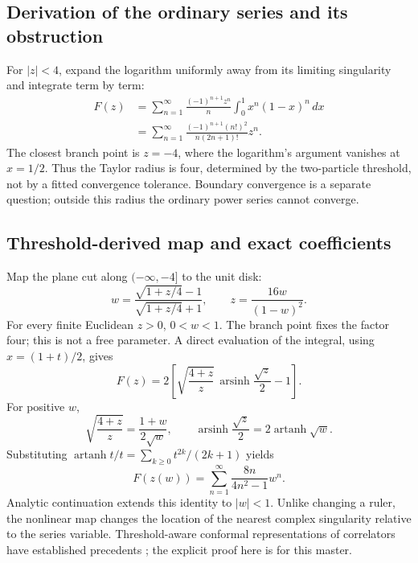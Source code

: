 \documentclass[11pt]{article}
\begin{document}
\subsection{Derivation of the ordinary series and its obstruction}
For $|z|<4$, expand the logarithm uniformly away from its limiting
singularity and integrate term by term:
\begin{align}
 F(z)&=\sum_{n=1}^\infty
       \frac{(-1)^{n+1}z^n}{n}\int_0^1x^n(1-x)^n\,dx\\
 &=\sum_{n=1}^\infty
       \frac{(-1)^{n+1}(n!)^2}{n(2n+1)!}z^n.
 \label{eq:taylor}
\end{align}
The closest branch point is $z=-4$, where the logarithm's argument
vanishes at $x=1/2$. Thus the Taylor radius is four, determined by
the two-particle threshold, not by a fitted convergence tolerance.
Boundary convergence is a separate question; outside this radius
the ordinary power series cannot converge.

\subsection{Threshold-derived map and exact coefficients}
Map the plane cut along $(-\infty,-4]$ to the unit disk:
\begin{equation}
 w=\frac{\sqrt{1+z/4}-1}{\sqrt{1+z/4}+1},
 \qquad z=\frac{16w}{(1-w)^2}.
 \label{eq:map}
\end{equation}
For every finite Euclidean $z>0$, $0<w<1$.
The branch point fixes the factor four; this is not a free parameter.
A direct evaluation of the integral, using $x=(1+t)/2$, gives
\begin{equation}
 F(z)=2\left[\sqrt{\frac{4+z}{z}}\,
                   \operatorname{arsinh}\frac{\sqrt z}{2}-1\right].
\end{equation}
For positive $w$,
\begin{equation}
 \sqrt{\frac{4+z}{z}}=\frac{1+w}{2\sqrt w},\qquad
 \operatorname{arsinh}\frac{\sqrt z}{2}=2\operatorname{artanh}\sqrt w.
\end{equation}
Substituting $\operatorname{artanh}t/t=\sum_{k\ge0}t^{2k}/(2k+1)$ yields
\begin{equation}
 \boxed{F(z(w))=\sum_{n=1}^\infty\frac{8n}{4n^2-1}w^n.}
 \label{eq:mapped}
\end{equation}
Analytic continuation extends this identity to $|w|<1$. Unlike changing
a ruler, the nonlinear map changes the location of the nearest complex
singularity relative to the series variable.
Threshold-aware conformal representations of correlators have established
precedents \cite{Greynat}; the explicit proof here is for this master.
\end{document}

